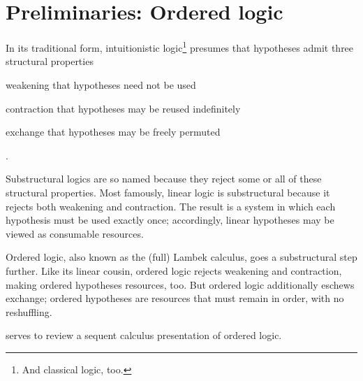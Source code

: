 \chapter{Preliminaries: Ordered logic}\label{ch:ordered-logic}




In its traditional form, intuitionistic logic\footnote{And classical logic, too.} presumes that hypotheses admit three structural properties
\begin{description*}[
  mode=unboxed,
  before=\unskip:\space,
  font=\normalfont, afterlabel={,\space},
  itemjoin=;\space, itemjoin*=; and\space%
]
\item[weakening] that hypotheses need not be used
\item[contraction] that hypotheses may be reused indefinitely
\item[exchange] that hypotheses may be freely permuted
\end{description*}.

Substructural logics are so named because they reject some or all of these structural properties.
Most famously, linear logic\autocite{Girard:TCS87} is substructural because it rejects both weakening and contraction.
The result is a system in which each hypothesis must be used exactly once; accordingly, linear hypotheses may be viewed as consumable resources\autocite{Girard:TCS87}.

Ordered logic, also known as the (full) Lambek calculus,\autocites{Lambek:AMM58}{Abrusci:MLQ90}{Kanazawa:LLI92} goes a substructural step further.
Like its linear cousin, ordered logic rejects weakening and contraction, making ordered hypotheses resources, too.
But ordered logic additionally eschews exchange; 
ordered hypotheses are resources that must remain in order, with no reshuffling.


serves to review a sequent calculus presentation of ordered logic.





